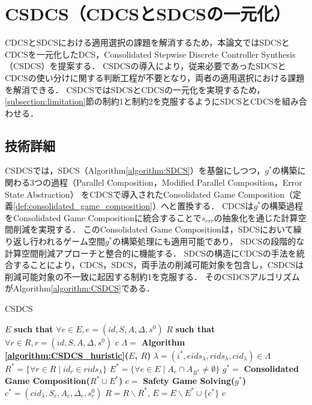 \section{CSDCS（CDCSとSDCSの一元化）}
\label{section:proposal}
CDCSとSDCSにおける適用選択の課題を解消するため，本論文ではSDCSとCDCSを一元化したDCS，Consolidated Stepwise Discrete Controller Synthesis（CSDCS）を提案する．
CSDCSの導入により，従来必要であったSDCSとCDCSの使い分けに関する判断工程が不要となり，両者の適用選択における課題を解消できる．
CSDCSではSDCSとCDCSの一元化を実現するため，\ref{subsection:limitation}節の制約1と制約2を克服するようにSDCSとCDCSを組み合わせる．

\subsection{技術詳細}
CSDCSでは，SDCS（Algorithm\ref{algorithm:SDCS}）を基盤にしつつ，$g^{*}$の構築に関わる3つの過程（Parallel Composition，Modified Parallel Composition，Error State Abstraction）
をCDCSで導入されたConsolidated Game Composition（定義\ref{def:consolidated_game_composition}）へと置換する．
CDCSは$g^{*}$の構築過程をConsolidated Game Compositionに統合することで$s_{err}$の抽象化を通じた計算空間削減を実現する．
このConsolidated Game Compositionは，SDCSにおいて繰り返し行われるゲーム空間$g^{*}$の構築処理にも適用可能であり，
SDCSの段階的な計算空間削減アプローチと整合的に機能する．
SDCSの構造にCDCSの手法を統合することにより，CDCS，SDCS，両手法の削減可能対象を包含し，CSDCSは削減可能対象の不一致に起因する制約1を克服する．
そのCSDCSアルゴリズムがAlgorithm\ref{algorithm:CSDCS}である．

\begin{algorithm}[h]
\caption{CSDCS}
\label{algorithm:CSDCS}
\begin{algorithmic}[1]
\renewcommand{\algorithmicrequire}{\textbf{Input:}}
\renewcommand{\algorithmicensure}{\textbf{Output:}}
\REQUIRE $E$ {\bf such that} $\forall e \in E, e = (id, S, A, \Delta, s^0)$
\REQUIRE $R$ {\bf such that} $\forall r \in R, r = (id, S, A, \Delta, s^0)$
\ENSURE $c$
\STATE $\Lambda =$ {\bf Algorithm \ref{algorithm:CSDCS_huristic}($E$, $R$)}
    \STATE $\lambda = (i^*, eids_{\lambda}, rids_{\lambda}, cid_{\lambda}) \in \Lambda$
    \STATE $R^* = \{\forall r \in R \mid id_{r} \in rids_{\lambda}\}$
    \STATE $E^* = \{\forall e \in E \mid A_{e} \cap A_{R^*} \neq \emptyset\}$
    \STATE $g^* =$ {\bf Consolidated Game Composition($R^* \cup E^*$)}
    \STATE $c   =$ {\bf Safety Game Solving($g^*$)}
    \STATE $c^* = (cid_{\lambda}, S_{c}, A_{c}, \Delta_{c}, s^0_{c})$
    \STATE $R   = R \backslash R^*$, $E = E \backslash E^* \cup \{c^*\}$
\ENDFOR
{} $c$
\end{algorithmic}
\end{algorithm}

